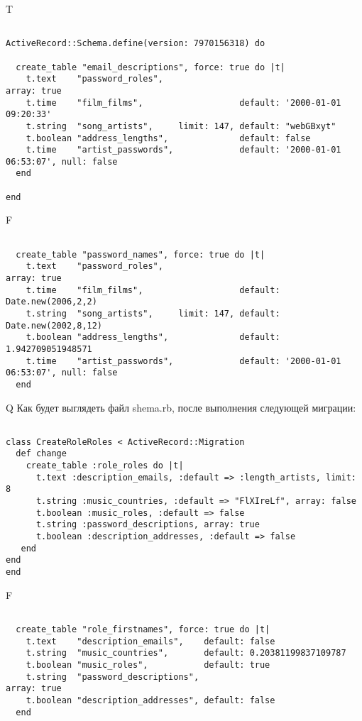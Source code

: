 T
\begin{verbatim}

ActiveRecord::Schema.define(version: 7970156318) do

  create_table "email_descriptions", force: true do |t|
    t.text    "password_roles",                                                            array: true
    t.time    "film_films",                   default: '2000-01-01 09:20:33'
    t.string  "song_artists",     limit: 147, default: "webGBxyt"
    t.boolean "address_lengths",              default: false
    t.time    "artist_passwords",             default: '2000-01-01 06:53:07', null: false
  end

end
\end{verbatim}


F
\begin{verbatim}

  create_table "password_names", force: true do |t|
    t.text    "password_roles",                                                            array: true
    t.time    "film_films",                   default: Date.new(2006,2,2)
    t.string  "song_artists",     limit: 147, default: Date.new(2002,8,12)
    t.boolean "address_lengths",              default: 1.942709051948571
    t.time    "artist_passwords",             default: '2000-01-01 06:53:07', null: false
  end

\end{verbatim}

Q
Как будет выглядеть файл shema.rb, после выполнения следующей миграции:

\begin{verbatim}

class CreateRoleRoles < ActiveRecord::Migration 
  def change 
    create_table :role_roles do |t| 
      t.text :description_emails, :default => :length_artists, limit: 8
      t.string :music_countries, :default => "FlXIreLf", array: false
      t.boolean :music_roles, :default => false
      t.string :password_descriptions, array: true
      t.boolean :description_addresses, :default => false
   end
end
end
\end{verbatim}

F
\begin{verbatim}

  create_table "role_firstnames", force: true do |t|
    t.text    "description_emails",    default: false
    t.string  "music_countries",       default: 0.20381199837109787
    t.boolean "music_roles",           default: true
    t.string  "password_descriptions",                            array: true
    t.boolean "description_addresses", default: false
  end

\end{verbatim}

